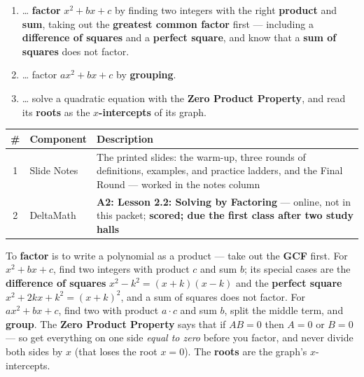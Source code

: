 \documentclass[12pt]{article}
\begin{document}

\namedateperiod
\vspace{0.18in}

\boxguard[14]
\begin{learningtargetbox}
\small
\begin{enumerate}[leftmargin=1.5em, itemsep=5pt]
  \item \ldots{} \textbf{factor} $x^2+bx+c$ by finding two integers with the right
        \textbf{product} and \textbf{sum}, taking out the \textbf{greatest common factor} first
        --- including a \textbf{difference of squares} and a \textbf{perfect square}, and know
        that a \textbf{sum of squares} does not factor.
  \item \ldots{} factor $ax^2+bx+c$ by \textbf{grouping}.
  \item \ldots{} solve a quadratic equation with the \textbf{Zero Product Property}, and read its
        \textbf{roots} as the \textbf{$x$-intercepts} of its graph.
\end{enumerate}
\end{learningtargetbox}

\vspace{0.14in}

\boxguard[14]
\begin{tocbox}
\small
\renewcommand{\arraystretch}{1.5}
\begin{tabularx}{\linewidth}{@{} c l X @{}}
\rowcolor{forestbg}
\textbf{\#} & \textbf{Component} & \textbf{Description} \\
\midrule
1 & Slide Notes & The printed slides: the warm-up, three rounds of definitions, examples, and
                  practice ladders, and the Final Round --- worked in the notes column \\
2 & DeltaMath & \textbf{A2: Lesson 2.2: Solving by Factoring} --- online, not in this packet;
                  \textbf{scored; due the first class after two study halls} \\
\end{tabularx}
\end{tocbox}

\vspace{0.14in}

\boxguard[8]
\begin{remindbox}
\small
To \textbf{factor} is to write a polynomial as a product --- take out the \textbf{GCF} first. For
$x^2+bx+c$, find two integers with product $c$ and sum $b$; its special cases are the
\textbf{difference of squares} $x^2-k^2=(x+k)(x-k)$ and the \textbf{perfect square}
$x^2+2kx+k^2=(x+k)^2$, and a sum of squares does not factor. For $ax^2+bx+c$, find two with
product $a\cdot c$ and sum $b$, split the middle term, and \textbf{group}. The \textbf{Zero
Product Property} says that if $AB=0$ then $A=0$ or $B=0$ --- so get everything on one side
\emph{equal to zero} before you factor, and never divide both sides by $x$ (that loses the root
$x=0$). The \textbf{roots} are the graph's $x$-intercepts.
\end{remindbox}
\end{document}
